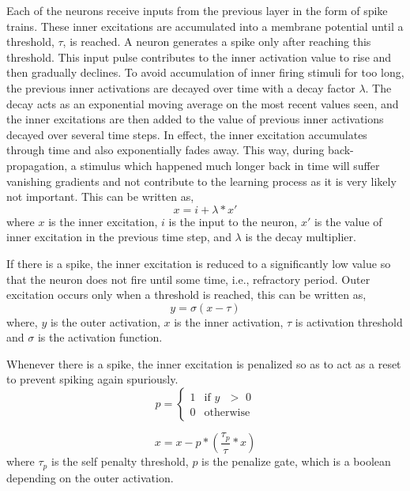 \documentclass{article}
\begin{document}
Each of the neurons receive inputs from the previous layer in the form of spike trains. These inner excitations are accumulated into a membrane potential until a threshold, $\tau$, is reached. A neuron generates a spike only after reaching this threshold. This input pulse contributes to the inner activation value to rise and then gradually declines. To avoid accumulation of inner firing stimuli for too long, the previous inner activations are decayed over time with a decay factor $\lambda$. The decay acts as an exponential moving average on the most recent values seen, and the inner excitations are then added to the value of previous inner activations decayed over several time steps. In effect, the inner excitation accumulates through time and also exponentially fades away. This way, during back-propagation, a stimulus which happened much longer back in time will suffer vanishing gradients and not contribute to the learning process as it is very likely not important. This can be written as,
\begin{equation}
    x = i + \lambda *x' 
\end{equation}
where $x$ is the inner excitation, $i$ is the input to the neuron, $x'$ is the value of inner excitation in the previous time step, and $\lambda$ is the decay multiplier.

If there is a spike, the inner excitation is reduced to a significantly low value so that the neuron does not fire until some time, i.e., refractory period. Outer excitation occurs only when a threshold is reached, this can be written as,
 \begin{equation}
     y = \sigma(x-\tau)      
 \end{equation}
where, $y$ is the outer activation, $x$ is the inner activation, $\tau$ is activation threshold and $\sigma$ is the activation function.
 
Whenever there is a spike, the inner excitation is penalized so as to act as a reset to prevent spiking again spuriously.
\begin{equation}
  p =
    \begin{cases}
      1 & \text{if $y$ $>$ 0}\\
      0 & \text{otherwise}
    \end{cases}       
\end{equation}

\begin{equation}
    x = x - p * (\frac{\tau_p}{\tau} * x)
\end{equation}
where $\tau_p$ is the self penalty threshold, $p$ is the penalize gate, which is a boolean depending on the outer activation.
\end{document}

